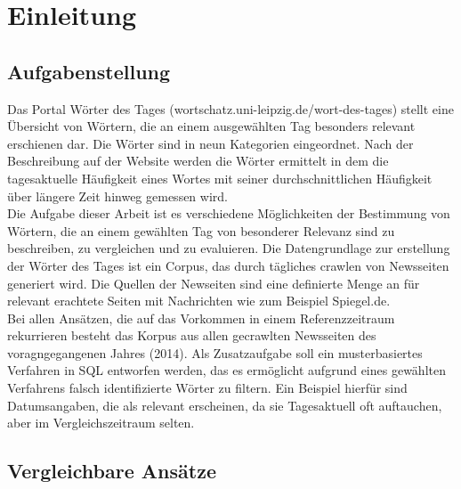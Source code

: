 


\ourtitlepage 
\tableofcontents
{} %
\clearpage
{} %



\chapter{Einleitung}

\section{Aufgabenstellung}
Das Portal Wörter des Tages (wortschatz.uni-leipzig.de/wort-des-tages) stellt eine Übersicht von Wörtern, die an einem ausgewählten Tag besonders relevant erschienen dar. Die Wörter sind in neun Kategorien eingeordnet. Nach der Beschreibung auf der Website werden die Wörter ermittelt in dem die tagesaktuelle Häufigkeit eines Wortes mit seiner durchschnittlichen Häufigkeit über längere Zeit hinweg gemessen wird.\\
Die Aufgabe dieser Arbeit ist es verschiedene Möglichkeiten der Bestimmung von Wörtern, die an einem gewählten Tag von besonderer Relevanz sind zu beschreiben, zu vergleichen und zu evaluieren. 
Die Datengrundlage zur erstellung der Wörter des Tages ist ein Corpus, das durch tägliches crawlen von Newsseiten generiert wird. Die Quellen der Newseiten sind eine definierte Menge an für relevant erachtete Seiten mit Nachrichten wie zum Beispiel Spiegel.de.\\
Bei allen Ansätzen, die auf das Vorkommen in einem Referenzzeitraum rekurrieren besteht das Korpus aus allen gecrawlten Newsseiten des voragngegangenen Jahres (2014).
Als Zusatzaufgabe soll ein musterbasiertes Verfahren in SQL entworfen werden, das es ermöglicht aufgrund eines gewählten Verfahrens falsch identifizierte Wörter zu filtern. Ein Beispiel hierfür sind Datumsangaben, die als relevant erscheinen, da sie Tagesaktuell oft auftauchen, aber im Vergleichszeitraum selten.

\section{Vergleichbare Ansätze}



